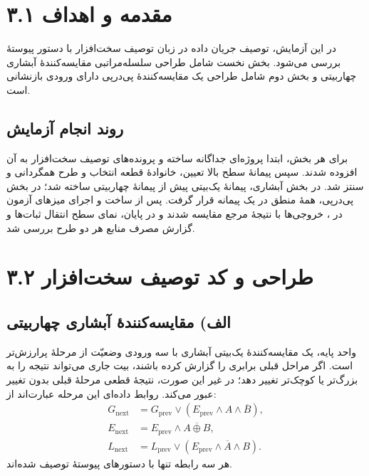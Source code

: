 \documentclass[12pt,a4paper]{article}
\begin{document}

	\section*{۳.۱ مقدمه و اهداف}
	در این آزمایش، توصیف جریان داده در زبان توصیف سخت‌افزار  با دستور پیوستهٔ  بررسی می‌شود. بخش نخست شامل طراحی سلسله‌مراتبی مقایسه‌کنندهٔ آبشاری چهاربیتی و بخش دوم شامل طراحی یک مقایسه‌کنندهٔ پی‌درپی دارای ورودی بازنشانی است.

	\subsection*{روند انجام آزمایش}
	برای هر بخش، ابتدا پروژه‌ای جداگانه ساخته و پرونده‌های توصیف سخت‌افزار به آن افزوده شدند. سپس پیمانهٔ سطح بالا تعیین، خانوادهٔ قطعه انتخاب و طرح همگردانی و سنتز شد. در بخش آبشاری، پیمانهٔ یک‌بیتی پیش از پیمانهٔ چهاربیتی ساخته شد؛ در بخش پی‌درپی، همهٔ منطق در یک پیمانه قرار گرفت. پس از ساخت و اجرای میزهای آزمون در ، خروجی‌ها با نتیجهٔ مرجع مقایسه شدند و در پایان، نمای سطح انتقال ثبات‌ها و گزارش مصرف منابع هر دو طرح بررسی شد.

	\section*{۳.۲ طراحی و کد توصیف سخت‌افزار}
	\subsection*{الف) مقایسه‌کنندهٔ آبشاری چهاربیتی}
	واحد پایه، یک مقایسه‌کنندهٔ یک‌بیتی آبشاری با سه ورودی وضعیّت از مرحلهٔ پرارزش‌تر است. اگر مراحل قبلی برابری را گزارش کرده باشند، بیت جاری می‌تواند نتیجه را به بزرگ‌تر یا کوچک‌تر تغییر دهد؛ در غیر این صورت، نتیجهٔ قطعی مرحلهٔ قبلی بدون تغییر عبور می‌کند. روابط داده‌ای این مرحله عبارت‌اند از:
	\[
	\begin{aligned}
	G_{\mathrm{next}}&=G_{\mathrm{prev}}\lor(E_{\mathrm{prev}}\land A\land\overline{B}),\\
	E_{\mathrm{next}}&=E_{\mathrm{prev}}\land\overline{A\oplus B},\\
	L_{\mathrm{next}}&=L_{\mathrm{prev}}\lor(E_{\mathrm{prev}}\land\overline{A}\land B).
	\end{aligned}
	\]
	هر سه رابطه تنها با دستورهای پیوستهٔ  توصیف شده‌اند.

\end{document}
